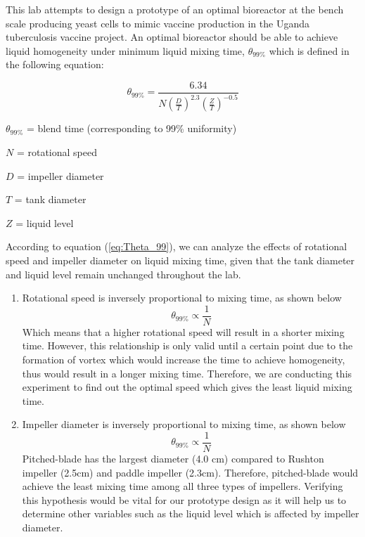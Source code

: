 This lab attempts to design a prototype of an optimal bioreactor at the bench scale producing yeast cells to mimic vaccine production in the Uganda tuberculosis vaccine project.
An optimal bioreactor should be able to achieve liquid homogeneity under minimum liquid mixing time,
$\theta_{99\%} $
which is defined in the following equation:  

 \begin{equation} \label{eq:Theta_99}
 	\theta_{99\%} = \frac{6.34}{
		N \left( \frac{D}{T} \right)^{2.3}
		{\left( \frac{Z}{T} \right)}^{-0.5}
	}
 \end{equation}
 
 $\theta_{99\%}$ = blend time (corresponding to 99\% uniformity)  
 
 $N$ = rotational speed  
 
 $D$ = impeller diameter  
 
 $T$ = tank diameter  
 
 $Z$ = liquid level 
 
 According to equation (\ref{eq:Theta_99}), we can analyze the effects of rotational speed and impeller diameter on liquid mixing time, given that the tank diameter and liquid level remain unchanged throughout the lab.
 
 \begin{enumerate}
 	\item Rotational speed is inversely proportional to mixing time, as shown below\begin{equation}
 		\theta_{99\%} \propto \frac{1}{N}
 	\end{equation}
 	Which means that a higher rotational speed will result in a shorter mixing time. However, this relationship is only valid until a certain point due to the formation of vortex which would increase the time to achieve homogeneity, thus would result in a longer mixing time. Therefore, we are conducting this experiment to find out the optimal speed which gives the least liquid mixing time.  
 	\item Impeller diameter is inversely proportional to mixing time, as shown below
		\begin{equation}
	 		\theta_{99\%} \propto \frac{1}{N}
		\end{equation}
 	Pitched-blade has the largest diameter (4.0 cm) compared to Rushton impeller (2.5cm) and paddle impeller (2.3cm). Therefore, pitched-blade would achieve the least mixing time among all three types of impellers. Verifying this hypothesis would be vital for our prototype design as it will help us to determine other variables such as the liquid level which is affected by impeller diameter. 
\end{enumerate}


